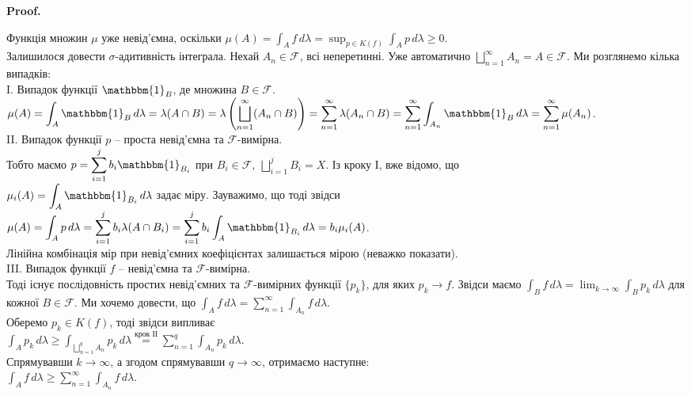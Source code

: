 \documentclass[a4paper, 10pt]{article}
\makeatletter
\theoremstyle{theoremdd}
\renewenvironment{proof}[1][Proof.\\]{\par
\pushQED{\hfill \qed}%
\normalfont \topsep6\p@\@plus6\p@\relax
\trivlist
\item\relax
{\bfseries
#1\@addpunct{.}}\hspace\labelsep\ignorespaces
}{%
\popQED\endtrivlist\@endpefalse
}
\makeatother
\begin{document}
\begin{proof}
Функція множин $\mu$ уже невід'ємна, оскільки $\mu(A) = \displaystyle\int_A f\,d\lambda = \sup_{p \in K(f)} \int_A p\,d\lambda \geq 0$.\\
Залишилося довести $\sigma$-адитивність інтеграла. Нехай $A_n \in \mathcal{F}$, всі неперетинні. Уже автоматично $\displaystyle\bigsqcup_{n=1}^\infty A_n = A \in \mathcal{F}$. Ми розглянемо кілька випадків:\\
I. Випадок функції $\mathbbm{1}_B$, де множина $B \in \mathcal{F}$.\\
$\displaystyle\mu(A) = \displaystyle\int_A \mathbbm{1}_B\,d\lambda = \lambda(A \cap B) = \lambda\left( \bigsqcup_{n=1}^\infty (A_n \cap B) \right) = \sum_{n=1}^\infty \lambda(A_n \cap B) = \sum_{n=1}^\infty \int_{A_n} \mathbbm{1}_B\,d\lambda = \sum_{n=1}^\infty \mu(A_n)$.
\bigskip \\
II. Випадок функції $p$ -- проста невід'ємна та $\mathcal{F}$-вимірна.\\
Тобто маємо $p = \displaystyle\sum_{i=1}^j b_i \mathbbm{1}_{B_i}$ при $B_i \in \mathcal{F},\ \displaystyle\bigsqcup_{i=1}^j B_i = X$. Із кроку І, вже відомо, що\\
$\mu_i(A) = \displaystyle\int_A \mathbbm{1}_{B_i}\,d\lambda$ задає міру. Зауважимо, що тоді звідси\\
$\mu(A) = \displaystyle\int_A p\,d\lambda = \sum_{i=1}^j b_i \lambda(A \cap B_i) = \sum_{i=1}^j b_i \int_A \mathbbm{1}_{B_i}\,d\lambda = b_i \mu_i(A)$.\\
Лінійна комбінація мір при невід'ємних коефіцієнтах залишається мірою (неважко показати).
\bigskip \\
III. Випадок функції $f$ -- невід'ємна та $\mathcal{F}$-вимірна.\\
Тоді існує послідовність простих невід'ємних та $\mathcal{F}$-вимірних функції $\{p_k\}$, для яких $p_k\to f$. Звідси маємо $\displaystyle\int_B f\,d\lambda = \lim_{k \to \infty} \int_B p_k\,d\lambda$ для кожної $B \in \mathcal{F}$. Ми хочемо довести, що $\displaystyle\int_A f\,d\lambda = \sum_{n=1}^\infty \int_{A_n} f\,d\lambda$.\\
Оберемо $p_k \in K(f)$, тоді звідси випливає\\
$\displaystyle\int_A p_k\,d\lambda \geq \int_{\bigsqcup_{n=1}^q A_n} p_k\,d\lambda \overset{\text{крок ІІ}}{=} \sum_{n=1}^q \int_{A_n} p_k\,d\lambda$.\\
Спрямувавши $k \to \infty$, а згодом спрямувавши $q \to \infty$, отримаємо наступне:\\
$\displaystyle\int_A f\,d\lambda \geq \sum_{n=1}^\infty \int_{A_n} f\,d\lambda$.\\

\end{proof}
\end{document}
